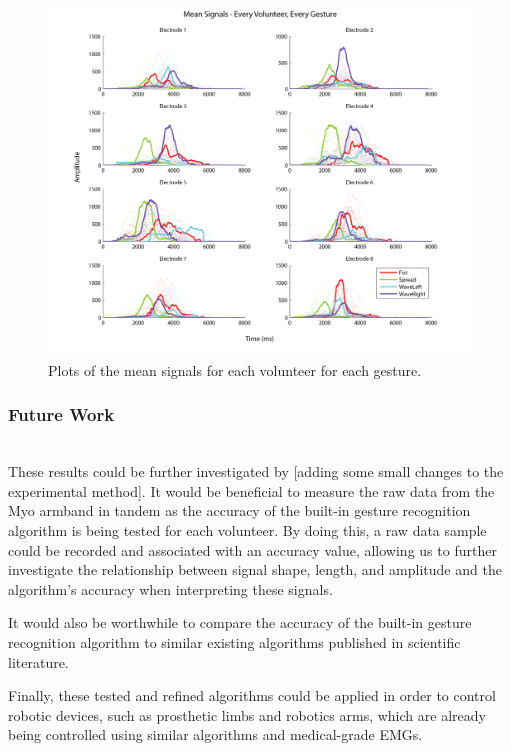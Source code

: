 \documentclass[journal]{IEEEtran}
\begin{document}
    \begin{figure}[H]
    \includegraphics[width=1\columnwidth]{EMG/Mean_All}
    \caption{Plots of the mean signals for each volunteer for each gesture.}
    \label{Mean_All}
    \end{figure}

\subsubsection{Future Work} \\
These results could be further investigated by [adding some small changes to the experimental method].
It would be beneficial to measure the raw data from the Myo armband in tandem as the accuracy of the built-in gesture recognition algorithm is being tested for each volunteer. By doing this, a raw data sample could be recorded and associated with an accuracy value, allowing us to further investigate the relationship between signal shape, length, and amplitude and the algorithm's accuracy when interpreting these signals. 

It would also be worthwhile to compare the accuracy of the built-in gesture recognition algorithm to similar existing algorithms published in scientific literature.

Finally, these tested and refined algorithms could be applied in order to control robotic devices, such as prosthetic limbs and robotics arms, which are already being controlled using similar algorithms and medical-grade EMGs.

\newpage
\FloatBarrier
\end{document}
